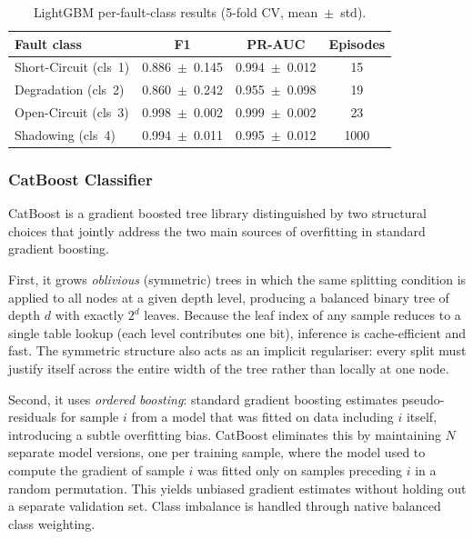 \begin{table}[H]
\centering
\caption{LightGBM per-fault-class results (5-fold CV, mean~$\pm$~std).\label{tab:lgbm-per-class}}
\begin{tabular}{lccc}
\toprule
\textbf{Fault class} & \textbf{F1} & \textbf{PR-AUC} & \textbf{Episodes} \\
\midrule
Short-Circuit (cls~1) & 0.886~$\pm$~0.145 & 0.994~$\pm$~0.012 & 15 \\
Degradation   (cls~2) & 0.860~$\pm$~0.242 & 0.955~$\pm$~0.098 & 19 \\
Open-Circuit  (cls~3) & 0.998~$\pm$~0.002 & 0.999~$\pm$~0.002 & 23 \\
Shadowing     (cls~4) & 0.994~$\pm$~0.011 & 0.995~$\pm$~0.012 & 1000 \\
\bottomrule
\end{tabular}
\end{table}

\subsubsection{CatBoost Classifier}

CatBoost is a gradient boosted tree library distinguished by two structural choices that jointly address the two main sources of overfitting in standard gradient boosting.

First, it grows \emph{oblivious} (symmetric) trees in which the same splitting condition is applied to all nodes at a given depth level, producing a balanced binary tree of depth $d$ with exactly $2^d$ leaves. Because the leaf index of any sample reduces to a single table lookup (each level contributes one bit), inference is cache-efficient and fast. The symmetric structure also acts as an implicit regulariser: every split must justify itself across the entire width of the tree rather than locally at one node.

Second, it uses \emph{ordered boosting}: standard gradient boosting estimates pseudo-residuals for sample $i$ from a model that was fitted on data including $i$ itself, introducing a subtle overfitting bias. CatBoost eliminates this by maintaining $N$ separate model versions, one per training sample, where the model used to compute the gradient of sample $i$ was fitted only on samples preceding $i$ in a random permutation. This yields unbiased gradient estimates without holding out a separate validation set. Class imbalance is handled through native balanced class weighting.

